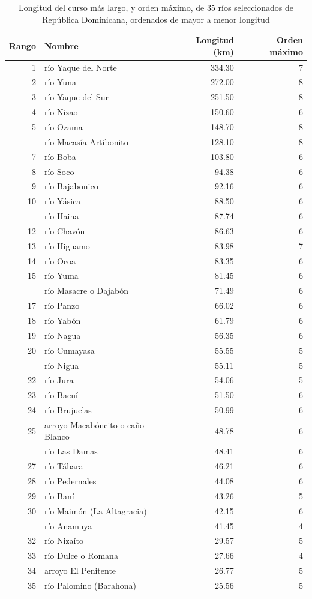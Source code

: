 \documentclass[spanish]{article}
\begin{document}
\begin{table}[H]

\caption{\label{tab:tablacursosmaslargos}Longitud del curso más largo, y orden máximo, de 35 ríos seleccionados de República Dominicana, ordenados de mayor a menor longitud}
\centering
\begin{tabular}[t]{rlrr}
\toprule
Rango & Nombre & Longitud (km) & Orden máximo\\
\midrule
1 & río Yaque del Norte & 334.30 & 7\\
2 & río Yuna & 272.00 & 8\\
3 & río Yaque del Sur & 251.50 & 8\\
4 & río Nizao & 150.60 & 6\\
5 & río Ozama & 148.70 & 8\\
\addlinespace
6 & río Macasía-Artibonito & 128.10 & 8\\
7 & río Boba & 103.80 & 6\\
8 & río Soco & 94.38 & 6\\
9 & río Bajabonico & 92.16 & 6\\
10 & río Yásica & 88.50 & 6\\
\addlinespace
11 & río Haina & 87.74 & 6\\
12 & río Chavón & 86.63 & 6\\
13 & río Higuamo & 83.98 & 7\\
14 & río Ocoa & 83.35 & 6\\
15 & río Yuma & 81.45 & 6\\
\addlinespace
16 & río Masacre o Dajabón & 71.49 & 6\\
17 & río Panzo & 66.02 & 6\\
18 & río Yabón & 61.79 & 6\\
19 & río Nagua & 56.35 & 6\\
20 & río Cumayasa & 55.55 & 5\\
\addlinespace
21 & río Nigua & 55.11 & 5\\
22 & río Jura & 54.06 & 5\\
23 & río Bacuí & 51.50 & 6\\
24 & río Brujuelas & 50.99 & 6\\
25 & arroyo Macabóncito o caño Blanco & 48.78 & 6\\
\addlinespace
26 & río Las Damas & 48.41 & 6\\
27 & río Tábara & 46.21 & 6\\
28 & río Pedernales & 44.08 & 6\\
29 & río Baní & 43.26 & 5\\
30 & río Maimón (La Altagracia) & 42.15 & 6\\
\addlinespace
31 & río Anamuya & 41.45 & 4\\
32 & río Nizaíto & 29.57 & 5\\
33 & río Dulce o Romana & 27.66 & 4\\
34 & arroyo El Penitente & 26.77 & 5\\
35 & río Palomino (Barahona) & 25.56 & 5\\
\bottomrule
\end{tabular}
\end{table}
\end{document}
